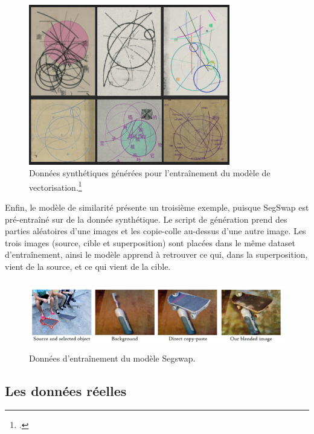           \begin{figure}[H]
          \begin{center}
          \includegraphics[height=7cm]{figues/vecto_synthetic_data.png}
          \end{center}
          \caption{Données synthétiques générées pour l'entraînement du modèle de vectorisation.\footcite[Figure issue de la présentation de Syrine Kalelli à l'occasion de la conférence ~:][]{noauthor_eida_nodate-1}}
          \label{fig:vecto_synthetic} \end{figure}

Enfin, le modèle de similarité présente un troisième exemple, puisque
SegSwap est pré-entraîné sur de la donnée synthétique. Le script de
génération prend des parties aléatoires d'une images et les copie-colle
au-dessus d'une autre image. Les trois images (source, cible et
superposition) sont placées dans le même dataset d'entraînement, ainsi
le modèle apprend à retrouver ce qui, dans la superposition, vient de la
source, et ce qui vient de la cible.

          \begin{figure}[H]
          \begin{center}
          \includegraphics[height=3cm]{figues/segswap_blended_images.png}
          \end{center}
          \caption{Données d'entraînement du modèle Segswap.}
          \label{fig:segswap} \end{figure}

\hypertarget{les-donnees-reelles}{%
\subsection{Les données réelles}\label{les-donnees-reelles}}

